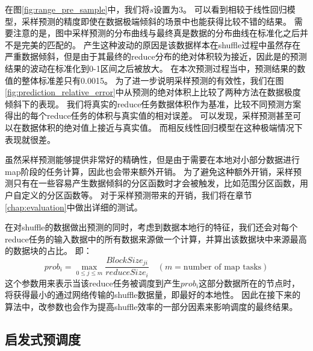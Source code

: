 在图\ref{fig:range_pre_sample}中，我们将$s$设置为3。
可以看到相较于线性回归模型，采样预测的精度即使在数据极端倾斜的场景中也能获得比较不错的结果。
需要注意的是，图中采样预测的分布曲线与最终真是数据的分布曲线在标准化之后并不是完美的匹配的。
产生这种波动的原因是该数据样本在shuffle过程中虽然存在严重数据倾斜，但是由于其最终的reduce分布的绝对体积较为接近，因此是的预测结果的波动在标准化到0-1区间之后被放大。
在本次预测过程当中，预测结果的数值的整体标准差只有0.0015。
为了进一步说明采样预测的有效性，我们在图\ref{fig:prediction_relative_error}中从预测的绝对体积上比较了两种方法在数据极度倾斜下的表现。
我们将真实的reduce任务数据体积作为基准，比较不同预测方案得出的每个reduce任务的体积与真实值的相对误差。
可以发现，采样预测甚至可以在数据体积的绝对值上接近与真实值。
而相反线性回归模型在这种极端情况下表现就很差。

虽然采样预测能够提供非常好的精确性，但是由于需要在本地对小部分数据进行map阶段的任务计算，因此也会带来额外开销。
为了避免这种额外开销，采样预测只有在一些容易产生数据倾斜的分区函数时才会被触发，比如范围分区函数，用户自定义的分区函数等。
对于采样预测带来的开销，我们将在章节\ref{chap:evaluation}中做出详细的测试。

在对shuffle的数据做出预测的同时，考虑到数据本地行的特征，我们还会对每个reduce任务的输入数据中的所有数据来源做一个计算，并算出该数据块中来源最高的数据块的占比。
即：
\begin{equation}
	\label{eq:prob}
	prob_i = \max_{0 \leq j \leq m} \frac{BlockSize_{ji}}{reduceSize_i} \quad (m = \text{number of map tasks})
\end{equation}
这个参数用来表示当该reduce任务被调度到产生$prob_i$这部分数据所在的节点时，将获得最小的通过网络传输的shuffle数据量，即最好的本地性。
因此在接下来的算法中，改参数也会作为提高shuffle效率的一部分因素来影响调度的最终结果。

\subsection{启发式预调度}
\label{subsec:schedule}

